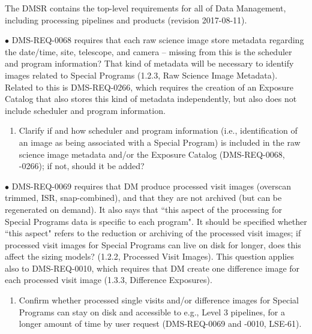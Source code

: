 \documentclass[DM,lsstdraft,toc]{lsstdoc}
\begin{document}
The DMSR contains the top-level requirements for all of Data Management, including processing pipelines and products (revision 2017-08-11).

$\bullet$ DMS-REQ-0068 requires that each raw science image store metadata regarding the date/time, site, telescope, and camera -- missing from this is the scheduler and program information? That kind of metadata will be necessary to identify images related to Special Programs (1.2.3, Raw Science Image Metadata). Related to this is DMS-REQ-0266, which requires the creation of an Exposure Catalog that also stores this kind of metadata independently, but also does not include scheduler and program information. 
\begin{enumerate}[topsep=-10pt,after=\vspace{10pt},label= \textbf{Concern \Roman*.},resume] \item \label{DMSR-1} Clarify if and how scheduler and program information (i.e., identification of an image as being associated with a Special Program) is included in the raw science image metadata and/or the Exposure Catalog (DMS-REQ-0068, -0266); if not, should it be added? \end{enumerate}

$\bullet$ DMS-REQ-0069 requires that DM produce processed visit images (overscan trimmed, ISR, snap-combined), and that they are not archived (but can be regenerated on demand). It also says that ``this aspect of the processing for Special Programs data is specific to each program". It should be specified whether ``this aspect" refers to the reduction or archiving of the processed visit images; if processed visit images for Special Programs can live on disk for longer, does this affect the sizing models? (1.2.2, Processed Visit Images). This question applies also to DMS-REQ-0010, which requires that DM create one difference image for each processed visit image (1.3.3, Difference Exposures).
\begin{enumerate}[topsep=-10pt,after=\vspace{10pt},label= \textbf{Concern \Roman*.},resume] \item \label{DMSR-2} Confirm whether processed single visits and/or difference images for Special Programs can stay on disk and accessible to e.g., Level 3 pipelines, for a longer amount of time by user request (DMS-REQ-0069 and -0010, LSE-61). \end{enumerate}
\end{document}
